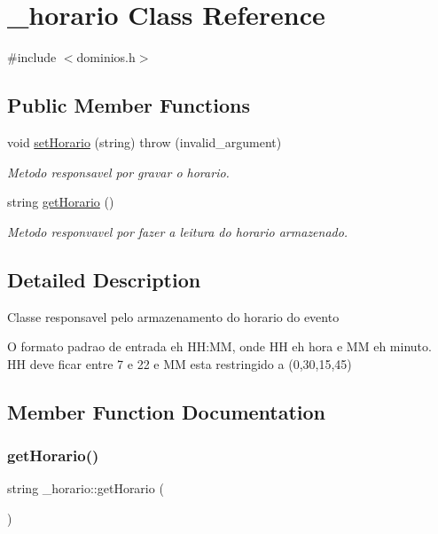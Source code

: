 \hypertarget{class__horario}{}\section{\+\_\+horario Class Reference}
\label{class__horario}


{\ttfamily \#include $<$dominios.\+h$>$}

\subsection*{Public Member Functions}
\begin{DoxyCompactItemize}
\item 
void \mbox{\hyperlink{class__horario_a4dc32be682df655ec6ed2c523488f0e4}{set\+Horario}} (string)  throw (invalid\+\_\+argument)
\begin{DoxyCompactList}\small\item\em Metodo responsavel por gravar o horario. \end{DoxyCompactList}\item 
string \mbox{\hyperlink{class__horario_a744c2d005ffb8b37ce5508513dcc8d6e}{get\+Horario}} ()
\begin{DoxyCompactList}\small\item\em Metodo responvavel por fazer a leitura do horario armazenado. \end{DoxyCompactList}\end{DoxyCompactItemize}


\subsection{Detailed Description}
Classe responsavel pelo armazenamento do horario do evento

O formato padrao de entrada eh HH\+:MM, onde HH eh hora e MM eh minuto. HH deve ficar entre 7 e 22 e MM esta restringido a (0,30,15,45) 

\subsection{Member Function Documentation}
\mbox{\label{class__horario_a744c2d005ffb8b37ce5508513dcc8d6e}} 
\subsubsection{\texorpdfstring{getHorario()}{getHorario()}}
{\footnotesize\ttfamily string \+\_\+horario\+::get\+Horario (\begin{DoxyParamCaption}{ }\end{DoxyParamCaption})\hspace{0.3cm}{\ttfamily [inline]}}



